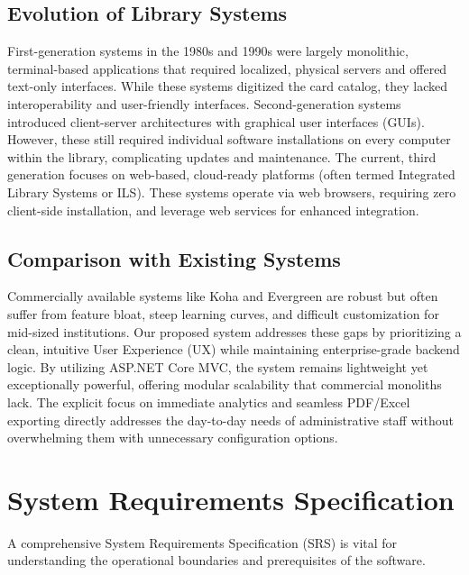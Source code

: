 \documentclass[conference]{IEEEtran}
\begin{document}
\subsection{Evolution of Library Systems}
First-generation systems in the 1980s and 1990s were largely monolithic, terminal-based applications that required localized, physical servers and offered text-only interfaces. While these systems digitized the card catalog, they lacked interoperability and user-friendly interfaces.
Second-generation systems introduced client-server architectures with graphical user interfaces (GUIs). However, these still required individual software installations on every computer within the library, complicating updates and maintenance.
The current, third generation focuses on web-based, cloud-ready platforms (often termed Integrated Library Systems or ILS). These systems operate via web browsers, requiring zero client-side installation, and leverage web services for enhanced integration.

\subsection{Comparison with Existing Systems}
Commercially available systems like Koha and Evergreen are robust but often suffer from feature bloat, steep learning curves, and difficult customization for mid-sized institutions.
Our proposed system addresses these gaps by prioritizing a clean, intuitive User Experience (UX) while maintaining enterprise-grade backend logic. By utilizing ASP.NET Core MVC, the system remains lightweight yet exceptionally powerful, offering modular scalability that commercial monoliths lack. The explicit focus on immediate analytics and seamless PDF/Excel exporting directly addresses the day-to-day needs of administrative staff without overwhelming them with unnecessary configuration options.

\section{System Requirements Specification}
A comprehensive System Requirements Specification (SRS) is vital for understanding the operational boundaries and prerequisites of the software.
\end{document}
